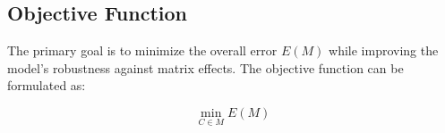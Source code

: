 
\subsection{Objective Function}
The primary goal is to minimize the overall error \( E(M) \) while improving the model's robustness against matrix effects. The objective function can be formulated as:

\[
\min_{C \in M} E(M)
\]
